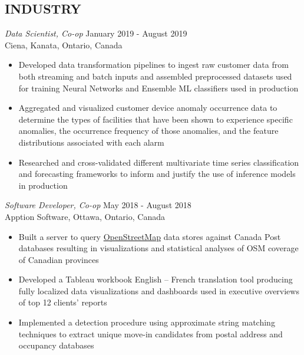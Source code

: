 \documentclass[margin]{res}
\begin{document}
\begin{resume}
      \section{INDUSTRY}
       {\sl Data Scientist, Co-op} \hfill January 2019 - August 2019 \\
      Ciena, Kanata, Ontario, Canada
      \begin{itemize}  \itemsep -2pt %
            \item Developed data transformation pipelines to ingest raw
                  customer data from both streaming and batch inputs and 
                  assembled preprocessed datasets used for training Neural Networks
                  and Ensemble ML classifiers used in production
            \item Aggregated and visualized customer device anomaly occurrence data
                  to determine the types
                  of facilities that have been shown to experience specific anomalies,
                  the occurrence frequency of those anomalies, and the feature distributions associated with each alarm
            \item Researched and cross-validated different multivariate time series classification and forecasting frameworks to inform and justify the use of inference models in production
      \end{itemize}
      {\sl Software Developer, Co-op} \hfill            May 2018 - August 2018\\
      Apption Software, Ottawa, Ontario, Canada
      \begin{itemize}  \itemsep -2pt %
            \item Built a server to query \href{https://www.openstreetmap.org/}{OpenStreetMap} data stores
                  against Canada Post databases resulting in visualizations and statistical analyses of OSM
                  coverage of Canadian provinces
            \item Developed a Tableau workbook English – French translation tool producing fully
                  localized data visualizations and dashboards used in executive overviews of top 12
                  clients’ reports 
            \item Implemented a detection procedure using approximate string matching techniques to extract
                  unique move-in candidates from postal address and occupancy databases 
      \end{itemize}
      

\end{resume}
\end{document}
